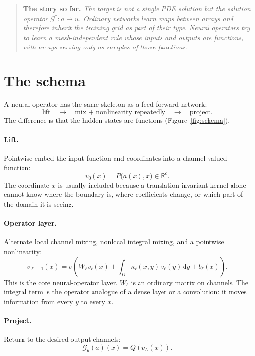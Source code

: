 \documentclass[10pt,a4paper]{article}
\newenvironment{recap}
{\par\medskip\noindent\begin{quote}\small\textbf{The story so far.}\itshape\;}
{\end{quote}\medskip}
\newcommand{\R}{\mathbb{R}}
\newcommand{\dd}{\mathrm{d}}
\newcommand{\G}{\mathcal{G}}
\begin{document}
\begin{recap}
The target is not a single PDE solution but the solution operator
$\G^\dagger : a \mapsto u$. Ordinary networks learn maps between arrays and
therefore inherit the training grid as part of their type. Neural operators
try to learn a mesh-independent rule whose inputs and outputs are functions,
with arrays serving only as samples of those functions.
\end{recap}

\section{The schema}
\label{sec:schema}

A neural operator has the same skeleton as a feed-forward network:
\[
  \text{lift} \quad \longrightarrow \quad
  \text{mix + nonlinearity repeatedly} \quad \longrightarrow \quad
  \text{project}.
\]
The difference is that the hidden states are functions
(Figure~\ref{fig:schema}).

\paragraph{Lift.}
Pointwise embed the input function and coordinates into a channel-valued
function:
\begin{equation}
  v_0(x) = P\big(a(x), x\big) \in \R^c.
\label{eq:lift}
\end{equation}
The coordinate $x$ is usually included because a translation-invariant kernel
alone cannot know where the boundary is, where coefficients change, or which
part of the domain it is seeing.

\paragraph{Operator layer.}
Alternate local channel mixing, nonlocal integral mixing, and a pointwise
nonlinearity:
\begin{equation}
  v_{\ell+1}(x)
  = \sigma\!\left(
      W_\ell v_\ell(x)
      + \int_D \kappa_\ell(x,y)\,v_\ell(y)\,\dd y
      + b_\ell(x)
    \right).
\label{eq:no-layer}
\end{equation}
This is the core neural-operator layer. $W_\ell$ is an ordinary matrix on
channels. The integral term is the operator analogue of a dense layer or a
convolution: it moves information from every $y$ to every $x$.

\paragraph{Project.}
Return to the desired output channels:
\begin{equation}
  \G_\theta(a)(x) = Q(v_L(x)).
\label{eq:project}
\end{equation}
\end{document}
